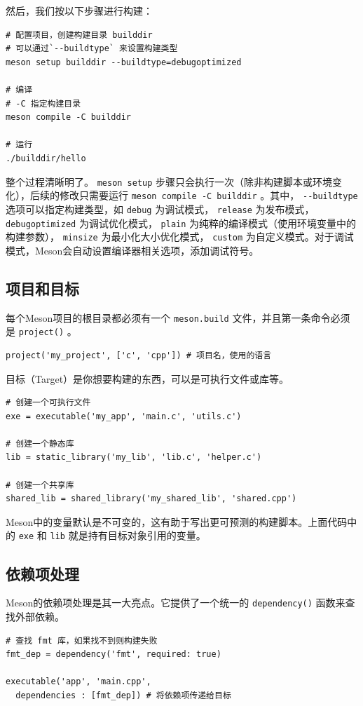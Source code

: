 然后，我们按以下步骤进行构建：
\begin{verbatim}
# 配置项目，创建构建目录 builddir
# 可以通过`--buildtype` 来设置构建类型
meson setup builddir --buildtype=debugoptimized

# 编译
# -C 指定构建目录
meson compile -C builddir

# 运行
./builddir/hello
\end{verbatim}

整个过程清晰明了。 \verb|meson setup| 步骤只会执行一次（除非构建脚本或环境变化），后续的修改只需要运行 \verb|meson compile -C builddir| 。其中， \verb|--buildtype| 选项可以指定构建类型，如 \verb|debug| 为调试模式， \verb|release| 为发布模式， \verb|debugoptimized| 为调试优化模式， \verb|plain| 为纯粹的编译模式（使用环境变量中的构建参数）， \verb|minsize| 为最小化大小优化模式， \verb|custom| 为自定义模式。对于调试模式，Meson会自动设置编译器相关选项，添加调试符号。

\subsection{项目和目标}
每个Meson项目的根目录都必须有一个 \verb|meson.build| 文件，并且第一条命令必须是 \verb|project()| 。
\begin{verbatim}
project('my_project', ['c', 'cpp']) # 项目名，使用的语言
\end{verbatim}

目标（Target）是你想要构建的东西，可以是可执行文件或库等。
\begin{verbatim}
# 创建一个可执行文件
exe = executable('my_app', 'main.c', 'utils.c')

# 创建一个静态库
lib = static_library('my_lib', 'lib.c', 'helper.c')

# 创建一个共享库
shared_lib = shared_library('my_shared_lib', 'shared.cpp')
\end{verbatim}

Meson中的变量默认是不可变的，这有助于写出更可预测的构建脚本。上面代码中的 \verb|exe| 和 \verb|lib| 就是持有目标对象引用的变量。

\subsection{依赖项处理}
Meson的依赖项处理是其一大亮点。它提供了一个统一的 \verb|dependency()| 函数来查找外部依赖。
\begin{verbatim}
# 查找 fmt 库，如果找不到则构建失败
fmt_dep = dependency('fmt', required: true)

executable('app', 'main.cpp',
  dependencies : [fmt_dep]) # 将依赖项传递给目标
\end{verbatim}

